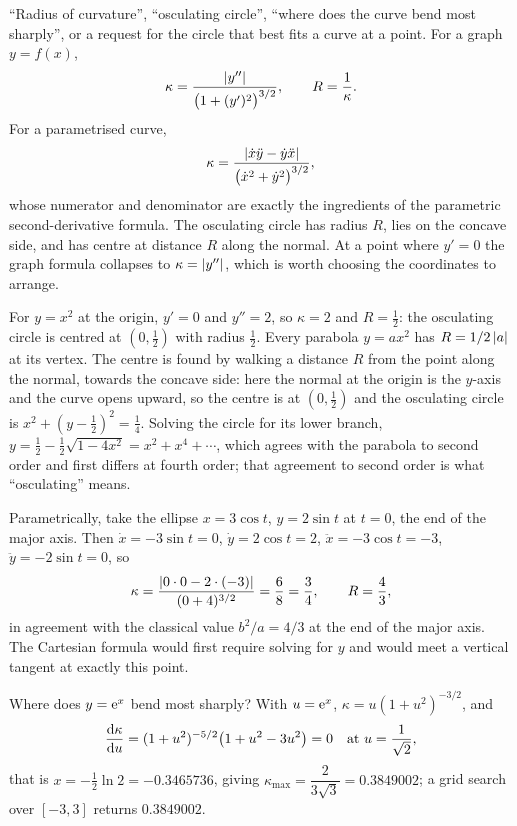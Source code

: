 \cue ``Radius of curvature'', ``osculating circle'', ``where does the curve bend most sharply'', or a request for the circle that best fits a curve at a point.
\method For a graph $y=f(x)$,
\[
\kappa=\frac{\left\lvert y''\right\rvert}{\bigl(1+(y')^{2}\bigr)^{3/2}},\qquad R=\frac1\kappa .
\]
For a parametrised curve,
\[
\kappa=\frac{\left\lvert \dot x\ddot y-\dot y\ddot x\right\rvert}{\bigl(\dot x^{2}+\dot y^{2}\bigr)^{3/2}} ,
\]
whose numerator and denominator are exactly the ingredients of the parametric second-derivative formula. The osculating circle has radius $R$, lies on the concave side, and has centre at distance $R$ along the normal. At a point where $y'=0$ the graph formula collapses to $\kappa=\left\lvert y''\right\rvert$, which is worth choosing the coordinates to arrange.

\begin{worked}
For $y=x^{2}$ at the origin, $y'=0$ and $y''=2$, so $\kappa=2$ and $R=\tfrac12$: the osculating circle is centred at $(0,\tfrac12)$ with radius $\tfrac12$. Every parabola $y=ax^{2}$ has $R=1/2\left\lvert a\right\rvert$ at its vertex. The centre is found by walking a distance $R$ from the point along the normal, towards the concave side: here the normal at the origin is the $y$-axis and the curve opens upward, so the centre is at $(0,\tfrac12)$ and the osculating circle is $x^{2}+(y-\tfrac12)^{2}=\tfrac14$. Solving the circle for its lower branch, $y=\tfrac12-\tfrac12\sqrt{1-4x^{2}}=x^{2}+x^{4}+\cdots$, which agrees with the parabola to second order and first differs at fourth order; that agreement to second order is what ``osculating'' means.

Parametrically, take the ellipse $x=3\cos t$, $y=2\sin t$ at $t=0$, the end of the major axis. Then $\dot x=-3\sin t=0$, $\dot y=2\cos t=2$, $\ddot x=-3\cos t=-3$, $\ddot y=-2\sin t=0$, so
\[
\kappa=\frac{\left\lvert 0\cdot0-2\cdot(-3)\right\rvert}{(0+4)^{3/2}}=\frac{6}{8}=\frac34,\qquad R=\frac43 ,
\]
in agreement with the classical value $b^{2}/a=4/3$ at the end of the major axis. The Cartesian formula would first require solving for $y$ and would meet a vertical tangent at exactly this point.

Where does $y=\mathrm{e}^{x}$ bend most sharply? With $u=\mathrm{e}^{x}$, $\kappa=u(1+u^{2})^{-3/2}$, and
\[
\frac{\mathrm{d}\kappa}{\mathrm{d}u}=(1+u^{2})^{-5/2}\bigl(1+u^{2}-3u^{2}\bigr)=0\quad\text{at } u=\frac{1}{\sqrt2},
\]
that is $x=-\tfrac12\ln2=-0.3465736$, giving $\kappa_{\max}=\dfrac{2}{3\sqrt3}=0.3849002$; a grid search over $[-3,3]$ returns $0.3849002$.
\end{worked}

